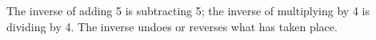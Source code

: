 The inverse of adding 5 is subtracting 5; 
the inverse of multiplying by 4 is dividing by 4.
The inverse undoes or reverses what has taken place.